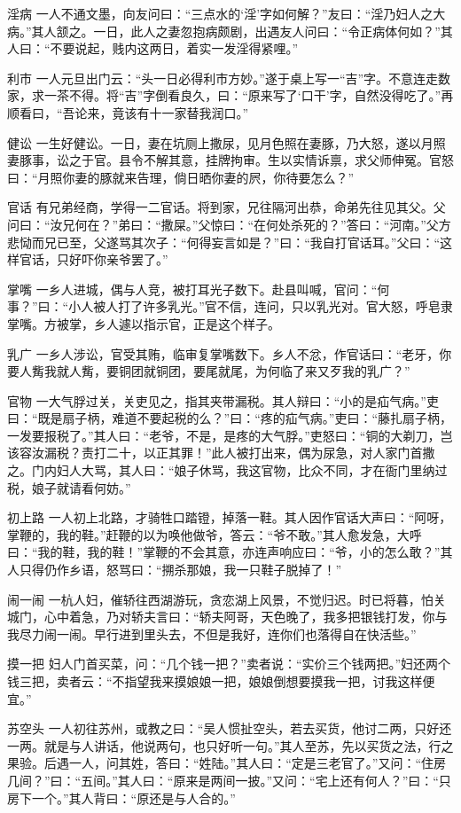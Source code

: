 \documentclass[12pt,UTF8]{ctexbook}
\begin{document}
淫病
一人不通文墨，向友问曰：“三点水的‘淫’字如何解？”友曰：“淫乃妇人之大病。”其人颔之。一日，此人之妻忽抱病颇剧，出遇友人问曰：“令正病体何如？”其人曰：“不要说起，贱内这两日，着实一发淫得紧哩。”

利市
一人元旦出门云：“头一日必得利市方妙。”遂于桌上写一“吉”字。不意连走数家，求一茶不得。将“吉”字倒看良久，曰：“原来写了‘口干’字，自然没得吃了。”再顺看曰，“吾论来，竟该有十一家替我润口。”

健讼
一生好健讼。一日，妻在坑厕上撒尿，见月色照在妻豚，乃大怒，遂以月照妻豚事，讼之于官。县令不解其意，挂牌拘审。生以实情诉禀，求父师伸冤。官怒曰：“月照你妻的豚就来告理，倘日晒你妻的屄，你待要怎么？”

官话
有兄弟经商，学得一二官话。将到家，兄往隔河出恭，命弟先往见其父。父问曰：“汝兄何在？”弟曰：“撒屎。”父惊曰：“在何处杀死的？”答曰：“河南。”父方悲恸而兄已至，父遂骂其次子：“何得妄言如是？”曰：“我自打官话耳。”父曰：“这样官话，只好吓你亲爷罢了。”

掌嘴
一乡人进城，偶与人竞，被打耳光子数下。赴县叫喊，官问：“何事？”曰：“小人被人打了许多乳光。”官不信，连问，只以乳光对。官大怒，呼皂隶掌嘴。方被掌，乡人遽以指示官，正是这个样子。

乳广
一乡人涉讼，官受其贿，临审复掌嘴数下。乡人不忿，作官话曰：“老牙，你要人觜我就人觜，要铜团就铜团，要尾就尾，为何临了来又歹我的乳广？”

官物
一大气脬过关，关吏见之，指其夹带漏税。其人辩曰：“小的是疝气病。”吏曰：“既是扇子柄，难道不要起税的么？”曰：“疼的疝气病。”吏曰：“藤扎扇子柄，一发要报税了。”其人曰：“老爷，不是，是疼的大气脬。”吏怒曰：“铜的大剃刀，岂该容汝漏税？责打二十，以正其罪！”此人被打出来，偶为尿急，对人家门首撒之。门内妇人大骂，其人曰：“娘子休骂，我这官物，比众不同，才在衙门里纳过税，娘子就请看何妨。”

初上路
一人初上北路，才骑牲口踏镫，掉落一鞋。其人因作官话大声曰：“阿呀，掌鞭的，我的鞋。”赶鞭的以为唤他做爷，答云：“爷不敢。”其人愈发急，大呼曰：“我的鞋，我的鞋！”掌鞭的不会其意，亦连声响应曰：“爷，小的怎么敢？”其人只得仍作乡语，怒骂曰：“搠杀那娘，我一只鞋子脱掉了！”

闹一闹
一杭人妇，催轿往西湖游玩，贪恋湖上风景，不觉归迟。时已将暮，怕关城门，心中着急，乃对轿夫言曰：“轿夫阿哥，天色晚了，我多把银钱打发，你与我尽力闹一闹。早行进到里头去，不但是我好，连你们也落得自在快活些。”

摸一把
妇人门首买菜，问：“几个钱一把？”卖者说：“实价三个钱两把。”妇还两个钱三把，卖者云：“不指望我来摸娘娘一把，娘娘倒想要摸我一把，讨我这样便宜。”

苏空头
一人初往苏州，或教之曰：“吴人惯扯空头，若去买货，他讨二两，只好还一两。就是与人讲话，他说两句，也只好听一句。”其人至苏，先以买货之法，行之果验。后遇一人，问其姓，答曰：“姓陆。”其人曰：“定是三老官了。”又问：“住房几间？”曰：“五间。”其人曰：“原来是两间一披。”又问：“宅上还有何人？”曰：“只房下一个。”其人背曰：“原还是与人合的。”
\end{document}
